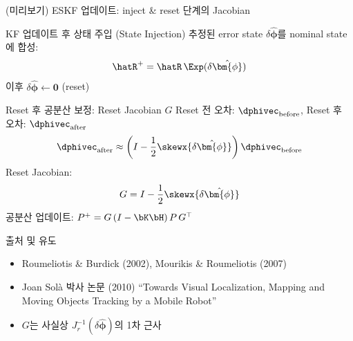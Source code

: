 \begin{frame}[shrink=5]{(미리보기) ESKF 업데이트: inject \& reset 단계의 Jacobian}
  \begin{block}{KF 업데이트 후 상태 주입 (State Injection)}
    추정된 error state $\delta\hat{\bm{\phi}}$를 nominal state에 합성:
    \[
      \hatR^+ = \hatR\,\Exp(\delta\hat{\bm{\phi}})
    \]
    이후 $\delta\hat{\bm{\phi}} \leftarrow \bm{0}$ (reset)
  \end{block}
  \pause
  \begin{alertblock}{Reset 후 공분산 보정: Reset Jacobian $G$}
    Reset 전 오차: $\dphivec_{\text{before}}$, Reset 후 오차: $\dphivec_{\text{after}}$
    \[
      \dphivec_{\text{after}} \approx \left(I - \frac{1}{2}\skewx{\delta\hat{\bm{\phi}}}\right)\dphivec_{\text{before}}
    \]
    Reset Jacobian:
    \[
      G = I - \frac{1}{2}\skewx{\delta\hat{\bm{\phi}}}
    \]
    공분산 업데이트: $P^+ = G\,(I - \bK\bH)\,P\,G^\top$
  \end{alertblock}
  \pause
  \begin{exampleblock}{출처 및 유도}
    \begin{itemize}
      \item Roumeliotis \& Burdick (2002), Mourikis \& Roumeliotis (2007)
      \item Joan Solà 박사 논문 (2010) ``Towards Visual Localization, Mapping and Moving Objects Tracking by a Mobile Robot''
      \item $G$는 사실상 $J_r^{-1}(\delta\hat{\bm{\phi}})$의 1차 근사
    \end{itemize}
  \end{exampleblock}
\end{frame}


